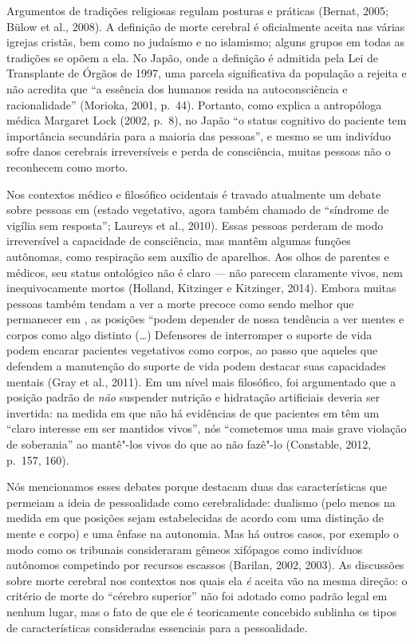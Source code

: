Argumentos de tradições religiosas regulam posturas e práticas (Bernat,
2005; Bülow et al., 2008). A definição de morte cerebral é oficialmente
aceita nas várias igrejas cristãs, bem como no judaísmo e no islamismo;
alguns grupos em todas as tradições se opõem a ela. No Japão, onde a
definição é admitida pela Lei de Transplante de Órgãos de 1997, uma
parcela significativa da população a rejeita e não acredita que ``a
essência dos humanos resida na autoconsciência e racionalidade''
(Morioka, 2001, p.~44). Portanto, como explica a antropóloga médica
Margaret Lock (2002, p.~8), no Japão ``o status cognitivo do paciente tem
importância secundária para a maioria das pessoas'', e mesmo se um
indivíduo sofre danos cerebrais irreversíveis e perda de consciência,
muitas pessoas não o reconhecem como morto.

Nos contextos médico e filosófico ocidentais é travado atualmente um
debate sobre pessoas em  (estado vegetativo, agora também chamado de
``síndrome de vigília sem resposta''; Laureys et al., 2010). Essas
pessoas perderam de modo irreversível a capacidade de consciência, mas
mantêm algumas funções autônomas, como respiração sem auxílio de
aparelhos. Aos olhos de parentes e médicos, seu status ontológico não é
claro --- não parecem claramente vivos, nem inequivocamente mortos
(Holland, Kitzinger e Kitzinger, 2014). Embora muitas pessoas também
tendam a ver a morte precoce como sendo melhor que permanecer em , as
posições ``podem depender de nossa tendência a ver mentes e corpos como
algo distinto (\ldots{}) Defensores de interromper o suporte de vida podem
encarar pacientes vegetativos como corpos, ao passo que aqueles que
defendem a manutenção do suporte de vida podem destacar suas capacidades
mentais (Gray et al., 2011). Em um nível mais filosófico, foi
argumentado que a posição padrão de \emph{não} suspender nutrição e
hidratação artificiais deveria ser invertida: na medida em que não há
evidências de que pacientes em  têm um ``claro interesse em ser
mantidos vivos'', nós ``cometemos uma mais grave violação de soberania''
ao mantê"-los vivos do que ao não fazê"-lo (Constable, 2012, p.~157, 160).

Nós mencionamos esses debates porque destacam duas das características
que permeiam a ideia de pessoalidade como cerebralidade: dualismo (pelo
menos na medida em que posições sejam estabelecidas de acordo com uma
distinção de mente e corpo) e uma ênfase na autonomia. Mas há outros
casos, por exemplo o modo como os tribunais consideraram gêmeos
xifópagos como indivíduos autônomos competindo por recursos escassos
(Barilan, 2002, 2003). As discussões sobre morte cerebral nos contextos
nos quais ela \emph{é} aceita vão na mesma direção: o critério de morte
do ``cérebro superior'' não foi adotado como padrão legal em nenhum
lugar, mas o fato de que ele é teoricamente concebido sublinha os tipos
de características consideradas essenciais para a pessoalidade.

